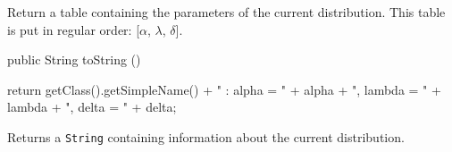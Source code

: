 \begin{tabb}
   Return a table containing the parameters of the current distribution.
   This table is put in regular order: [$\alpha$, $\lambda$, $\delta$].
\end{tabb}
\begin{hide}\begin{code}

   public String toString ()\begin{hide} {
      return getClass().getSimpleName() + " : alpha = " + alpha + ", lambda = " + lambda + ", delta = " + delta;
   }\end{hide}
\end{code}
\begin{tabb}
   Returns a \texttt{String} containing information about the current distribution.
\end{tabb}\end{hide}
\begin{code}\begin{hide}
}\end{hide}
\end{code}
